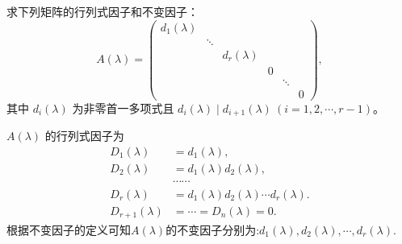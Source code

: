\documentclass[../../main.tex]{subfiles}%
\begin{document}
\begin{proposition}\label{proposition:相抵标准型的行列式因子和不变因子}
求下列矩阵的行列式因子和不变因子：
\[
A(\lambda)=\begin{pmatrix}
d_1(\lambda) & & & & \\
& \ddots & & & \\
& & d_r(\lambda) & & \\
& & & 0 & \\
& & & & \ddots & \\
& & & & & 0
\end{pmatrix},
\]
其中 $d_i(\lambda)$ 为非零首一多项式且 $d_i(\lambda)\mid d_{i + 1}(\lambda)\ (i = 1, 2, \cdots, r - 1)$。
\end{proposition}
\begin{solution}

$A(\lambda)$ 的行列式因子为
\begin{align*}
D_1(\lambda)&=d_1(\lambda),\\
D_2(\lambda)&=d_1(\lambda)d_2(\lambda),\\
&\cdots\cdots\\
D_r(\lambda)&=d_1(\lambda)d_2(\lambda)\cdots d_r(\lambda).
\\
D_{r+1}(\lambda)&=\cdots=D_n(\lambda)=0.
\end{align*}
根据不变因子的定义可知$A(\lambda)$的不变因子分别为:$d_1(\lambda),d_2(\lambda),\cdots,d_r(\lambda).$

\end{solution}
\end{document}
